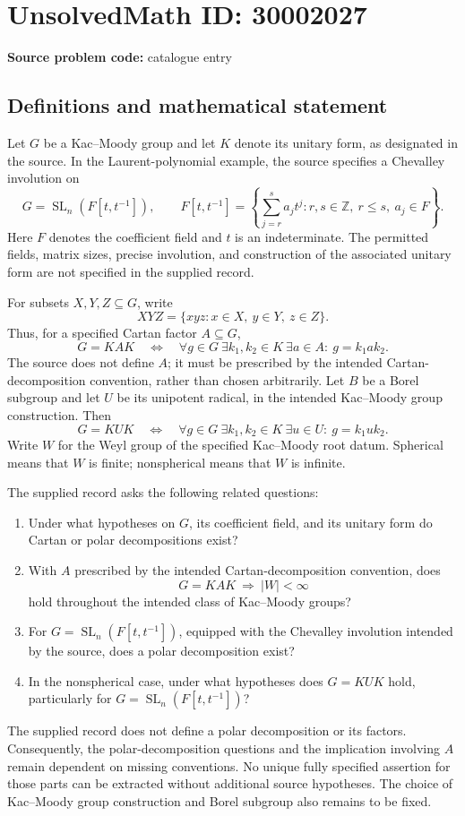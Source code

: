 \documentclass[11pt]{article}
\newcommand{\Z}{\mathbb{Z}}
\begin{document}
\section*{UnsolvedMath ID: 30002027}
\textbf{Source problem code:} catalogue entry
\subsection{Definitions and mathematical statement}
Let \(G\) be a Kac--Moody group and let \(K\) denote its unitary form, as designated in the source. In the Laurent-polynomial example, the source specifies a Chevalley involution on
\[
G=\operatorname{SL}_n(F[t,t^{-1}]),
\qquad
F[t,t^{-1}]=\left\{\sum_{j=r}^{s}a_jt^j:r,s\in\Z,\ r\leq s,\ a_j\in F\right\}.
\]
Here \(F\) denotes the coefficient field and \(t\) is an indeterminate. The permitted fields, matrix sizes, precise involution, and construction of the associated unitary form are not specified in the supplied record.

For subsets \(X,Y,Z\subseteq G\), write
\[
XYZ=\{xyz:x\in X,\ y\in Y,\ z\in Z\}.
\]
Thus, for a specified Cartan factor \(A\subseteq G\),
\[
G=KAK
\quad\Longleftrightarrow\quad
\forall g\in G\ \exists k_1,k_2\in K\ \exists a\in A:
\ g=k_1ak_2.
\]
The source does not define \(A\); it must be prescribed by the intended Cartan-decomposition convention, rather than chosen arbitrarily. Let \(B\) be a Borel subgroup and let \(U\) be its unipotent radical, in the intended Kac--Moody group construction. Then
\[
G=KUK
\quad\Longleftrightarrow\quad
\forall g\in G\ \exists k_1,k_2\in K\ \exists u\in U:
\ g=k_1uk_2.
\]
Write \(W\) for the Weyl group of the specified Kac--Moody root datum. Spherical means that \(W\) is finite; nonspherical means that \(W\) is infinite.

The supplied record asks the following related questions:
\begin{enumerate}
\item Under what hypotheses on \(G\), its coefficient field, and its unitary form do Cartan or polar decompositions exist?
\item With \(A\) prescribed by the intended Cartan-decomposition convention, does
\[
G=KAK\ \Longrightarrow\ |W|<\infty
\]
hold throughout the intended class of Kac--Moody groups?
\item For \(G=\operatorname{SL}_n(F[t,t^{-1}])\), equipped with the Chevalley involution intended by the source, does a polar decomposition exist?
\item In the nonspherical case, under what hypotheses does \(G=KUK\) hold, particularly for \(G=\operatorname{SL}_n(F[t,t^{-1}])\)?
\end{enumerate}
The supplied record does not define a polar decomposition or its factors. Consequently, the polar-decomposition questions and the implication involving \(A\) remain dependent on missing conventions. No unique fully specified assertion for those parts can be extracted without additional source hypotheses. The choice of Kac--Moody group construction and Borel subgroup also remains to be fixed.
\end{document}

